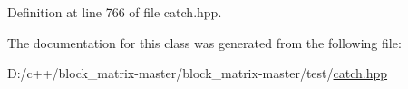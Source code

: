 Definition at line 766 of file catch.\+hpp.



The documentation for this class was generated from the following file\+:\begin{DoxyCompactItemize}
\item 
D\+:/c++/block\+\_\+matrix-\/master/block\+\_\+matrix-\/master/test/\mbox{\hyperlink{catch_8hpp}{catch.\+hpp}}\end{DoxyCompactItemize}
